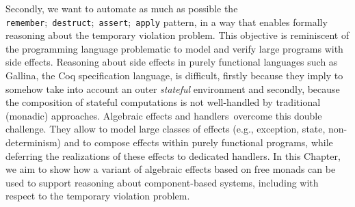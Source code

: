 Secondly, we want to automate as much as possible the
\texttt{remember};~\texttt{destruct};~\texttt{assert};~\texttt{apply} pattern,
in a way that enables formally reasoning about the temporary violation problem.
%
This objective is reminiscent of the programming language problematic to model
and verify large programs with side effects.
%
Reasoning about side effects in purely functional languages such as {\textsc
  Gallina}, the Coq specification language, is difficult, firstly because they
imply to somehow take into account an outer \emph{stateful} environment and
secondly, because the composition of stateful computations is not well-handled
by traditional (monadic) approaches.
%
Algebraic effects and handlers\,\cite{bauer2015effects} overcome this double
challenge.
%
They allow to model large classes of effects (e.g., exception, state,
non-determinism) and to compose effects within purely functional programs, while
deferring the realizations of these effects to dedicated handlers.
%
In this Chapter, we aim to show how a variant of algebraic effects based on free
monads can be used to support reasoning about component-based systems, including
with respect to the temporary violation problem.


